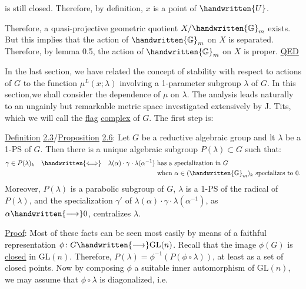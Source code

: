 
is still closed. Therefore, by definition, $x$ is a point of $\handwritten{U}$.

Therefore, a quasi-projective geometric quotient $X/\handwritten{\mathbb{G}}_m$ exists. But this implies that the action of $\handwritten{\mathbb{G}}_m$ on $X$ is separated. Therefore, by lemma 0.5, the action of $\handwritten{\mathbb{G}}_m$ on $X$ is proper. \uline{QED}

 In the last section, we have related the concept of stability with respect to actions of $G$ to the function $\mu^L(x;\lambda)$ involving a 1-parameter subgroup $\lambda$ of $G$. In this section,we shall consider the dependence of $\mu$ on $\lambda$. The analysis leads naturally to an ungainly but remarkable metric space investigated extensively by J. Tits, which we will call the \uline{flag} \uline{complex} of $G$. The first step is:

\uline{Definition} \uline{2.3}/\uline{Proposition} \uline{2.6}: Let $G$ be a reductive algebraic group and lt $\lambda$ be a 1-PS of $G$. Then there is a unique algebraic subgroup $P(\lambda)\subset G$ such that:
\[
\begin{aligned}
\gamma\in P(\lambda)_k\quad\handwritten{\Longleftrightarrow}\quad\lambda(\alpha)\cdot\gamma\cdot\lambda(\alpha^{-1})&\text{ has a specialization in }G\\
&\text{ when }\alpha\in(\handwritten{\mathbb{G}}_m)_k\text{ specializes to }0.
\end{aligned}
\]
Moreover, $P(\lambda)$ is a parabolic subgroup of $G$, $\lambda$ is a 1-PS of the radical of $P(\lambda)$, and the specialization $\gamma'$ of $\lambda(\alpha)\cdot\gamma\cdot\lambda(\alpha^{-1})$, as $\alpha\handwritten{\longrightarrow}0$, centralizes $\lambda$.

\uline{Proof}: Most of these facts can be seen most easily by means of a faithful representation $\phi\colon G\handwritten{\longrightarrow}\mathrm{GL}(n)$. Recall that the image $\phi(G)$ is \uline{closed} in $\mathrm{GL}(n)$. Therefore, $P(\lambda)=\phi^{-1}(P(\phi\circ\lambda))$, at least as a set of closed points. Now by composing $\phi$   a suitable inner automorphism of $\mathrm{GL}(n)$, we may assume that $\phi\circ\lambda$ is diagonalized, i.e.
